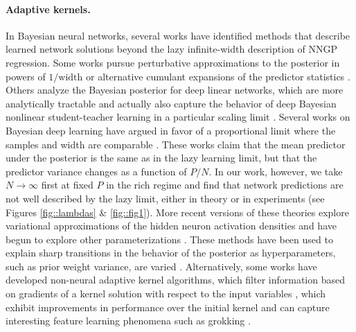 \vspace{-5pt}
\paragraph{Adaptive kernels.}

In Bayesian neural networks, several works have identified methods that describe learned network solutions beyond the lazy infinite-width description of NNGP regression. Some works pursue perturbative approximations to the posterior in powers of $1/\text{width}$ \cite{Zavatone_Veth_2022, roberts2022principles} or alternative cumulant expansions of the predictor statistics \cite{naveh2021self}. Others analyze the Bayesian posterior for deep linear networks, which are more analytically tractable \cite{aitchison2020biggerbetterfiniteinfinite, hanin2023bayesian, zavatone2022contrasting, bassetti2024featurelearningfinitewidthbayesian} and actually also capture the behavior of deep Bayesian nonlinear student-teacher learning in a particular scaling limit \cite{cui2023bayes}. Several works on Bayesian deep learning have argued in favor of a proportional limit where the samples and width are comparable \cite{Li_2021,Pacelli_2023,Aiudi2023LocalKR, vanmeegen2024codingschemesneuralnetworks,Baglioni2024}. These works claim that the mean predictor under the posterior is the same as in the lazy learning limit, but that the predictor variance changes as a function of $P/N$. In our work, however, we take $N \to \infty$ first at fixed $P$ in the rich regime and find that network predictions are not well described by the lazy limit, either in theory or in experiments (see Figures \ref{fig::lambdas} \& \ref{fig::fig1}).  More recent versions of these theories explore variational approximations of the hidden neuron activation densities \cite{seroussi2023separation, yang2023theory} and have begun to explore other parameterizations \cite{rubin2024a}. These methods have been used to explain sharp transitions in the behavior of the posterior as hyperparameters, such as prior weight variance, are varied \cite{rubin2024grokking}. Alternatively, some works have developed non-neural adaptive kernel algorithms, which filter information based on gradients of a kernel solution with respect to the input variables \cite{radhakrishnan2022mechanism}, which exhibit improvements in performance over the initial kernel and can capture interesting feature learning phenomena such as grokking \cite{mallinar2024emergence}. 

\vspace{-10pt}